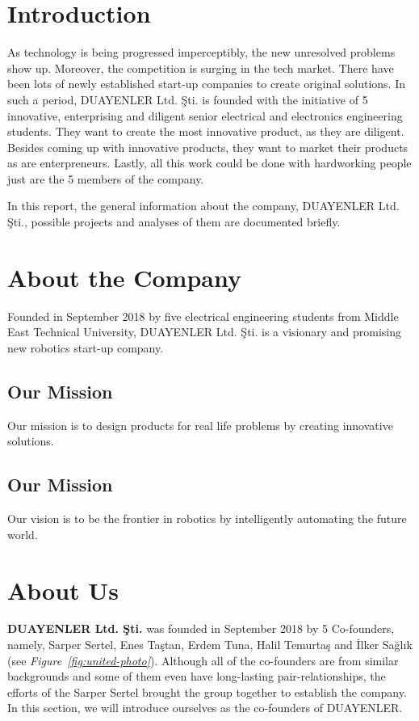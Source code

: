 \documentclass[a4paper,12pt]{article}
\newcommand{\blankpage}{
	\- \\[9cm]	
	{ \centering \textit{This page intentionally left blank.} \par }
	\- \\[9cm]
}%
\begin{document}
\tableofcontents
\newpage


\section{Introduction}
	As technology is being progressed imperceptibly, the new unresolved problems show up. Moreover, the competition is surging in the tech market. There have been lots of newly established start-up companies to create original solutions. In such a period, DUAYENLER Ltd. Şti. is founded with the initiative of 5 innovative, enterprising and diligent senior electrical and electronics engineering students. They want to create the most innovative product, as they are diligent. Besides coming up with innovative products, they want to market their products as are enterpreneurs. Lastly, all this work could be done with hardworking people just are the 5 members of the company.
	
	 In this report, the general information about the company, DUAYENLER Ltd. Şti., possible projects and analyses of them are documented briefly.
	
\section{About the Company}
	Founded in September 2018 by five electrical engineering students from Middle East Technical University, DUAYENLER Ltd. Şti. is a visionary and promising new robotics start-up company.

\subsection{Our Mission}
	Our mission is to design products for real life problems by creating innovative solutions.
	
\subsection{Our Mission}
	Our vision is to be the frontier in robotics by intelligently automating the future world.

\section{About Us}
\textbf{DUAYENLER Ltd. Şti.} was founded in September 2018 by 5 Co-founders, namely, Sarper Sertel, Enes Taştan, Erdem Tuna, Halil Temurtaş and İlker Sağlık (see \textit{Figure~\ref{fig:united-photo}}).   Although all of the co-founders are from similar backgrounds and some of them even have long-lasting pair-relationships, the efforts of the Sarper Sertel brought  the group together to establish the company.  In this section, we will introduce ourselves as the co-founders of DUAYENLER.
\end{document}
